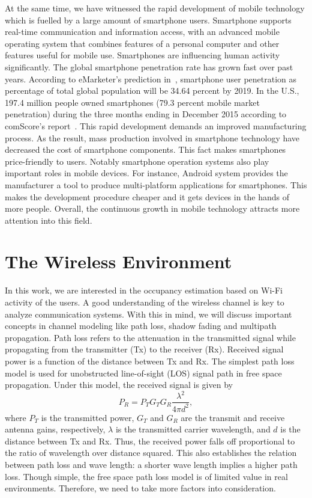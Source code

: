 At the same time, we have witnessed the rapid development of mobile technology which is fuelled by a large amount of smartphone users.
Smartphone supports real-time communication and information access, with an advanced mobile operating system that combines features of a personal computer and other features useful for mobile use.
Smartphones are influencing human activity significantly.
The global smartphone penetration rate has grown fast over past years.
According to eMarketer's prediction in~\cite{emarketer}, smartphone user penetration as percentage of total global population will be 34.64 percent by 2019.
In the U.S., 197.4 million people owned smartphones (79.3 percent mobile market penetration) during the three months ending in December 2015 according to comScore's report~\cite{comscore}.
This rapid development demands an improved manufacturing process.
As the result, mass production involved in smartphone technology have decreased the cost of smartphone components.
This fact makes smartphones price-friendly to users.
Notably smartphone operation systems also play important roles in mobile devices.
For instance, Android system provides the manufacturer a tool to produce multi-platform applications for smartphones.
This makes the development procedure cheaper and it gets devices in the hands of more people.
Overall, the continuous growth in mobile technology attracts more attention into this field.


\section{The Wireless Environment}

In this work, we are interested in the occupancy estimation based on Wi-Fi activity of the users.
A good understanding of the wireless channel is key to analyze communication systems.
With this in mind, we will discuss important concepts in channel modeling like path loss, shadow fading and multipath propagation.
Path loss refers to the attenuation in the transmitted signal while propagating from the transmitter (Tx) to the receiver (Rx).
Received signal power is a function of the distance between Tx and Rx.
The simplest path loss model is used for unobstructed line-of-sight (LOS) signal path in free space propagation.
Under this model, the received signal is given by
\begin{equation}
P_{R} = P_{T} G_{T} G_{R} \frac{\lambda^2}{4 \pi d^2} ,
\end{equation}
where $P_{T}$ is the transmitted power, $G_{T}$ and $G_{R}$ are the transmit and receive antenna gains, respectively, $\lambda$ is the transmitted carrier wavelength, and $d$ is the distance between Tx and Rx.
Thus, the received power falls off proportional to the ratio of wavelength over distance squared.
This also establishes the relation between path loss and wave length: a shorter wave length implies a higher path loss.
Though simple, the free space path loss model is of limited value in real environments.
Therefore, we need to take more factors into consideration.

